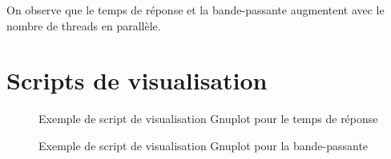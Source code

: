 \documentclass[a4paper]{article}
\begin{document}
\FloatBarrier

On observe que le temps de réponse et la bande-passante augmentent avec le nombre de threads en parallèle.


\newpage
\appendix

\section{Scripts de visualisation}
\begin{figure}[h]
	\begin{center}
		
	\end{center}
   	\caption{Exemple de script de visualisation Gnuplot pour le temps de réponse}
	\label{fig:scriptGnuplot2}
\end{figure}

\begin{figure}[h]
	\begin{center}
		
	\end{center}
   	\caption{Exemple de script de visualisation Gnuplot pour la bande-passante}
	\label{fig:scriptGnuplot}
\end{figure}

\FloatBarrier

\FloatBarrier

% 
\end{document}
